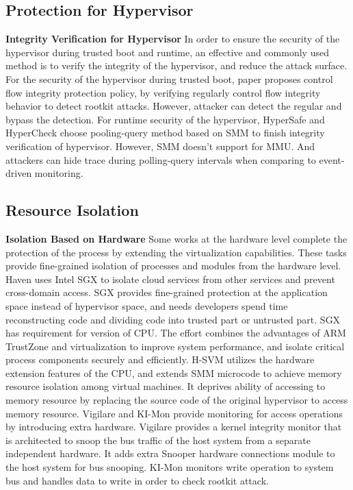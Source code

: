 \documentclass[conference]{IEEEtran}
\begin{document}
\subsection{Protection for Hypervisor}

\textbf{Integrity Verification for Hypervisor}
In order to ensure the security of the hypervisor during trusted boot and runtime, an effective and commonly used method is to verify the integrity of the hypervisor, and reduce the attack surface. For the security of the hypervisor during trusted boot, paper \cite{Petroni2007Automated} proposes control flow integrity protection policy, by verifying regularly control flow integrity behavior to detect rootkit attacks. However, attacker can detect the regular and bypass the detection. For runtime security of the hypervisor, HyperSafe \cite{Wang2010HyperSafe} and HyperCheck \cite{Wang2010HyperCheck} choose pooling-query method based on SMM to finish integrity verification of hypervisor. However, SMM doesn't support for MMU. And attackers can hide trace during polling-query intervals when comparing to event-driven monitoring.

\subsection{Resource Isolation}

\textbf{Isolation Based on Hardware }
Some works at the hardware level complete the protection of the process by extending the virtualization capabilities. These tasks provide fine-grained isolation of processes and modules from the hardware level. Haven \cite{haven} uses Intel SGX\cite{Hoekstra13cuvillo,Mckeen2013Innovative} to isolate cloud services from other services and prevent cross-domain access. SGX provides fine-grained protection at the application space instead of hypervisor space, and needs developers spend time reconstructing code and dividing code into trusted part or untrusted part. SGX has requirement for version of CPU. The effort \cite{Cho2016Hardware} combines the advantages of ARM TrustZone and virtualization to improve system performance, and isolate critical process components securely and efficiently. H-SVM\cite{Jin2015H} utilizes the hardware extension features of the CPU, and extends SMM microcode to achieve memory resource isolation among virtual machines. It deprives ability of accessing to memory resource by replacing the source code of the original hypervisor to access memory resource. Vigilare\cite{Moon2012Vigilare} and KI-Mon \cite{Lee2013KI} provide monitoring for access operations by introducing extra hardware. Vigilare provides a kernel integrity monitor that is architected to snoop the bus traffic of the host system from a separate independent hardware. It adds extra Snooper hardware connections module to the host system for bus snooping. KI-Mon monitors write operation to system bus and handles data to write in order to check rootkit attack.
\end{document}
